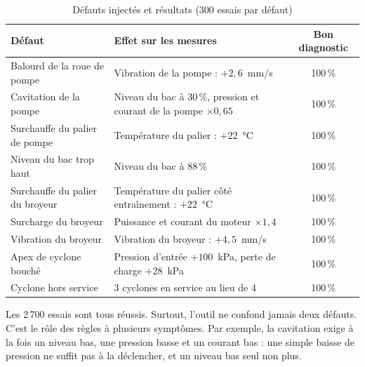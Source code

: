 \begin{table}[H]
\centering
\caption{Défauts injectés et résultats (300 essais par défaut)}
\label{tab:scenarios}
\small
\begin{tabularx}{\textwidth}{>{\raggedright\arraybackslash}p{3.6cm} X c}
\toprule
\textbf{Défaut} & \textbf{Effet sur les mesures} & \textbf{Bon diagnostic} \\
\midrule
Balourd de la roue de pompe & Vibration de la pompe : $+2{,}6$~mm/s & 100\,\% \\
Cavitation de la pompe & Niveau du bac à 30\,\%, pression et courant de la pompe $\times 0{,}65$ & 100\,\% \\
Surchauffe du palier de pompe & Température du palier : $+22$~°C & 100\,\% \\
Niveau du bac trop haut & Niveau du bac à 88\,\% & 100\,\% \\
Surchauffe du palier du broyeur & Température du palier côté entraînement : $+22$~°C & 100\,\% \\
Surcharge du broyeur & Puissance et courant du moteur $\times 1{,}4$ & 100\,\% \\
Vibration du broyeur & Vibration du broyeur : $+4{,}5$~mm/s & 100\,\% \\
Apex de cyclone bouché & Pression d'entrée $+100$~kPa, perte de charge $+28$~kPa & 100\,\% \\
Cyclone hors service & 3 cyclones en service au lieu de 4 & 100\,\% \\
\bottomrule
\end{tabularx}
\end{table}

Les 2\,700 essais sont tous réussis. Surtout, l'outil ne confond jamais deux défauts. C'est le rôle des règles à plusieurs symptômes. Par exemple, la cavitation exige à la fois un niveau bas, une pression basse et un courant bas : une simple baisse de pression ne suffit pas à la déclencher, et un niveau bas seul non plus.

